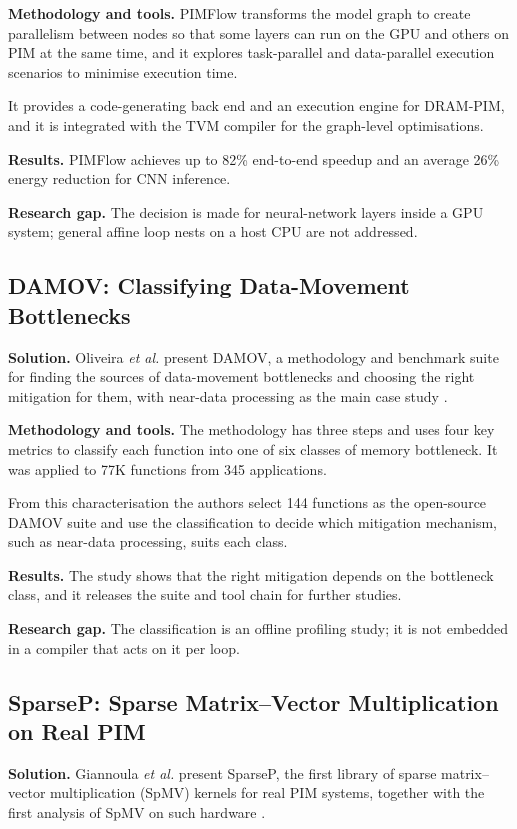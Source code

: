 \documentclass{ieeeaccess}
\begin{document}
\textbf{Methodology and tools.} PIMFlow transforms the model graph to create parallelism between nodes so that some layers can run on the GPU and others on PIM at the same time, and it explores task-parallel and data-parallel execution scenarios to minimise execution time.

It provides a code-generating back end and an execution engine for DRAM-PIM, and it is integrated with the TVM compiler for the graph-level optimisations.

\textbf{Results.} PIMFlow achieves up to 82\% end-to-end speedup and an average 26\% energy reduction for CNN inference.

\textbf{Research gap.} The decision is made for neural-network layers inside a GPU system; general affine loop nests on a host CPU are not addressed.

\subsection{DAMOV: Classifying Data-Movement Bottlenecks}
\textbf{Solution.} Oliveira \emph{et al.} present DAMOV, a methodology and benchmark suite for finding the sources of data-movement bottlenecks and choosing the right mitigation for them, with near-data processing as the main case study \cite{oliveira2021damov}.

\textbf{Methodology and tools.} The methodology has three steps and uses four key metrics to classify each function into one of six classes of memory bottleneck. It was applied to 77K functions from 345 applications.

From this characterisation the authors select 144 functions as the open-source DAMOV suite and use the classification to decide which mitigation mechanism, such as near-data processing, suits each class.

\textbf{Results.} The study shows that the right mitigation depends on the bottleneck class, and it releases the suite and tool chain for further studies.

\textbf{Research gap.} The classification is an offline profiling study; it is not embedded in a compiler that acts on it per loop.

\subsection{SparseP: Sparse Matrix--Vector Multiplication on Real PIM}
\textbf{Solution.} Giannoula \emph{et al.} present SparseP, the first library of sparse matrix--vector multiplication (SpMV) kernels for real PIM systems, together with the first analysis of SpMV on such hardware \cite{giannoula2022sparsep}.
\end{document}
